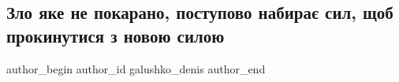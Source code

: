  
 
 
 
 

\subsection{Зло яке не покарано, поступово набирає сил, щоб прокинутися з новою силою}
\label{sec:19_10_2022.fb.galushko_denis.1.zlo_yake_ne_pokarano}

\ifcmt
 author_begin
   author_id galushko_denis
 author_end
\fi
